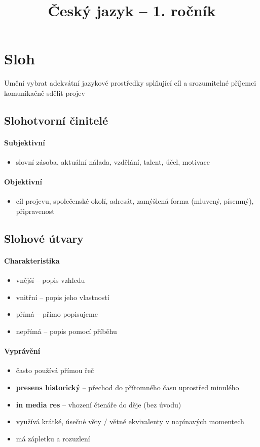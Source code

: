 \documentclass[10pt,a4paper]{article}
\title{Český jazyk -- 1. ročník}
\date{}
\author{}
\begin{document}
\maketitle
\tableofcontents
\newpage
\section{Sloh}
Umění vybrat adekvátní jazykové prostředky splňující cíl a srozumitelné příjemci komunikačně sdělit projev

\subsection{Slohotvorní činitelé}
\paragraph{Subjektivní}
\begin{itemize}
\item slovní zásoba, aktuální nálada, vzdělání, talent, účel, motivace
\end{itemize}

\paragraph{Objektivní}
\begin{itemize}
\item cíl projevu, společenské okolí, adresát, zamýšlená forma (mluvený, písemný), připravenost
\end{itemize}


\subsection{Slohové útvary}
\paragraph{Charakteristika}
\begin{itemize}
\item vnější -- popis vzhledu
\item vnitřní -- popis jeho vlastností
\item přímá -- přímo popisujeme
\item nepřímá -- popis pomocí příběhu
\end{itemize}

\paragraph{Vyprávění}
\begin{itemize}
\item často používá přímou řeč
\item \textbf{presens historický} -- přechod do přítomného času uprostřed minulého
\item \textbf{in media res} -- vhození čtenáře do děje (bez úvodu)
\item využívá krátké, úsečné věty / větné ekvivalenty v napínavých momentech
\item má zápletku a rozuzlení
\end{itemize}
\end{document}
